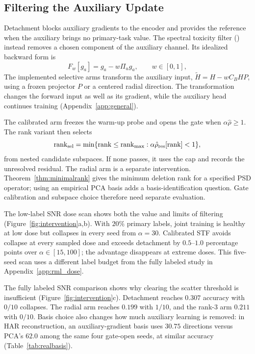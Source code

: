 \subsection{Filtering the Auxiliary Update}

Detachment blocks auxiliary gradients to the encoder and provides the reference when the auxiliary brings no primary-task value. The spectral toxicity filter (\STF{}) instead removes a chosen component of the auxiliary channel. Its idealized backward form is
\begin{equation}
 F_w[g_a]=g_a-w\Pi_u g_a,\qquad w\in[0,1],
 \label{eq:stf}
\end{equation}
The implemented selective arms transform the auxiliary input, $\widetilde H=H-wC_BHP$, using a frozen projector $P$ or a centered radial direction. The transformation changes the forward input as well as its gradient, while the auxiliary head continues training (Appendix~\ref{app:general}).

The calibrated arm freezes the warm-up probe and opens the gate when $\alpha\hat\rho\ge1$. The rank variant then selects
\begin{equation}
 \mathrm{rank}_{\rm sel}=\min\{\mathrm{rank}\le \mathrm{rank}_{\max}:\alpha\hat\rho_{\rm res}[\mathrm{rank}]<1\},
 \label{eq:calrule}
\end{equation}
from nested candidate subspaces. If none passes, it uses the cap and records the unresolved residual. The radial arm is a separate intervention. Theorem~\ref{thm:minimalrank} gives the minimum deletion rank for a specified PSD operator; using an empirical PCA basis adds a basis-identification question. Gate calibration and subspace choice therefore need separate evaluation.

\label{sec:conflict_ablations}
The low-label SNR dose scan shows both the value and limits of filtering (Figure~\ref{fig:intervention}a,b). With $20\%$ primary labels, joint training is healthy at low dose but collapses in every seed from $\alpha=30$. Calibrated STF avoids collapse at every sampled dose and exceeds detachment by $0.5$--$1.0$ percentage points over $\alpha\in[15,100]$; the advantage disappears at extreme doses. This five-seed scan uses a different label budget from the fully labeled study in Appendix~\ref{app:rml_dose}.

The fully labeled SNR comparison shows why clearing the scatter threshold is insufficient (Figure~\ref{fig:intervention}c). Detachment reaches $0.307$ accuracy with $0/10$ collapses. The radial arm reaches $0.199$ with $1/10$, and the rank-3 arm $0.211$ with $0/10$. Basis choice also changes how much auxiliary learning is removed: in HAR reconstruction, an auxiliary-gradient basis uses $30.75$ directions versus PCA's $62.0$ among the same four gate-open seeds, at similar accuracy (Table~\ref{tab:realbasis}).

